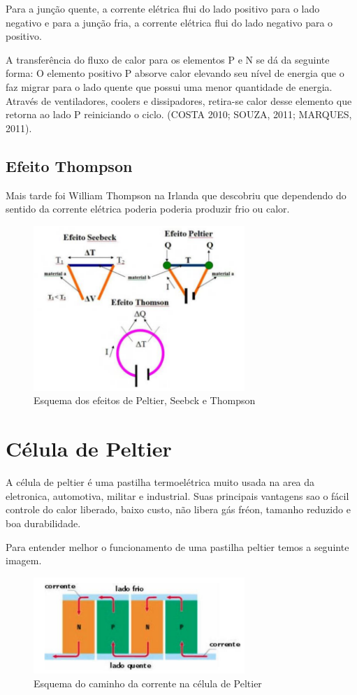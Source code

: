 Para a junção quente, a corrente elétrica flui do lado positivo para o lado negativo e para a junção fria, a corrente elétrica flui do lado negativo para o positivo. 

A transferência do fluxo de calor para os elementos P e N se dá da seguinte forma: O elemento positivo P absorve calor elevando seu nível de energia que o faz migrar para o lado quente que possui uma menor quantidade de energia. Através de ventiladores, coolers e dissipadores, retira-se calor desse elemento que retorna ao lado P reiniciando o ciclo. (COSTA 2010; SOUZA, 2011; MARQUES, 2011).

\subsection{Efeito Thompson}
Mais tarde foi William Thompson na Irlanda que descobriu que dependendo do sentido da corrente elétrica poderia poderia produzir frio ou calor.

\begin{figure}[H]
\centering
\includegraphics[width=8cm]{figuras/efeitothompson.png}
\caption{Esquema dos efeitos de Peltier, Seebck e Thompson}
\end{figure}

\section{Célula de Peltier}

A célula de peltier é uma pastilha termoelétrica muito usada na area da eletronica, automotiva, militar e industrial. Suas principais vantagens sao o fácil controle do calor liberado, baixo custo, não libera gás fréon, tamanho reduzido e boa durabilidade.

Para entender melhor o funcionamento de uma pastilha peltier temos a seguinte imagem.

\begin{figure}[H]
\centering
\includegraphics[width=8cm]{figuras/peltier1.png}
\caption{Esquema do caminho da corrente na célula de Peltier}
\end{figure}

